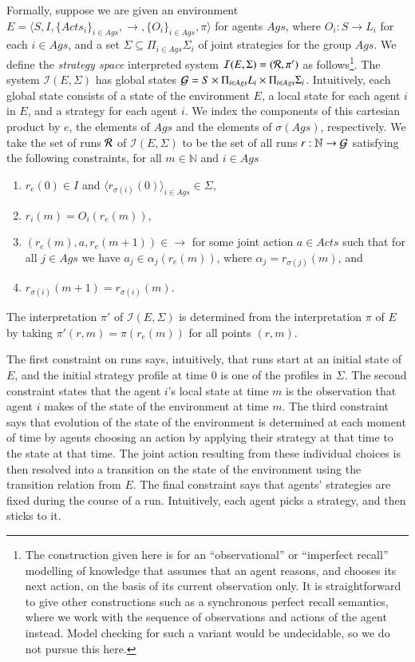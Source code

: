 \documentclass[a4wide]{article}
\newcommand{\trans}{\rightarrow}
\newcommand{\R}{{\cal R}}
\newcommand{\nat}{\mathbb{N}}
\theoremstyle{examplesty}
\newcommand{\strat}{\sigma}
\newcommand{\Ags}{\mathit{Ags}}
\newcommand{\I}{\mathcal{I}}
\newcommand{\Env}{E}
\newcommand{\Acts}{\mathit{Acts}}
\newcommand{\be}{\begin{enumerate}}
\newcommand{\ee}{\end{enumerate}}
\newcommand{\G}{{\cal G}}
\newcommand{\Strat}{\Sigma}
\newcommand{\Strats}{\Sigma}
\begin{document}
  
 Formally,
suppose we are 
  given an environment 
 $\Env =  \langle S, I, \{\Acts_i\}_{i\in \Ags}, \trans, \{O_i\}_{i\in \Ags}, \pi\rangle$ for agents $\Ags$, 
 where $O_i : S\rightarrow L_i$ for each $i\in \Ags$, 
 and a set $\Strat \subseteq \Pi_{i\in \Ags} \Strat_i$ of joint strategies for the group $\Ags$.  
We define the {\em strategy space} interpreted system  $\I(\Env,\Strats) = (\R, \pi')$
 as follows\footnote{The construction given here is for an ``observational'' or ``imperfect recall'' modelling of knowledge that assumes that an agent
 reasons, and chooses its next action, on the basis of its current observation only. It is straightforward to give other constructions such
 as a synchronous perfect recall semantics, where we work with the sequence of observations and  actions of the agent instead. Model checking for such a 
variant would be undecidable, so we do not pursue this here.}. 
The system $\I(\Env,\Strats)$ has global states $\G = S\times \Pi_{i\in \Ags} L_i \times \Pi_{i\in \Ags} \Sigma_i$. 
Intuitively, each global state consists of a state of the environment $E$, a local state for each agent $i$ in $E$, and a strategy for each agent $i$.   
We index the components of this cartesian product by $e$, the elements of $\Ags$ and the elements of $\strat(\Ags)$, respectively. 
We take the set of runs $\R$ of $\I(\Env,\Strats)$ to be the set of all runs $r: \nat \rightarrow \G$
satisfying the following constraints, for all $m\in \nat$ and $i\in \Ags$
\be 
\item $r_e(0) \in I$ and $\langle r_{\strat(i)}(0) \rangle_{i\in \Ags} \in \Strats$, 
\item  $r_i(m) = O_i(r_e(m))$,
\item  $(r_e(m), a,  r_e(m+1)) \in \trans $ for some joint action $a\in \Acts$ such that for all $j\in \Ags$ we have 
$a_j \in \alpha_j(r_e(m))$,
where $\alpha_j = r_{\sigma(j)}(m)$, and 
\item $r_{\sigma(i)}(m+1) = r_{\sigma(i)}(m)$. 
\ee
The interpretation $\pi'$ of $\I(\Env,\Strats)$ is determined from the interpretation  
$\pi$ of $\Env$ by taking $\pi'(r,m) = \pi(r_e(m))$ for all points $(r,m)$. 

The first constraint
on runs says, intuitively, 
 that runs start at an initial state of $E$, and 
the initial strategy profile at time $0$ is one of the profiles in $\Strats$. 
The second constraint states that the agent $i$'s local state  at time $m$ is the observation 
that agent $i$ makes of the state of the environment at time $m$. The third constraint 
says that evolution of the state of the environment is determined at each moment of time by agents choosing 
an action by applying their strategy at that time to 
the state at that time. The joint action resulting from these individual choices is then  
resolved into a transition on the state of the environment using the transition relation from $\Env$.  
The final constraint says that agents' strategies are fixed during the course of a run. 
Intuitively, each agent picks a strategy, and then sticks to it. 
\end{document}
